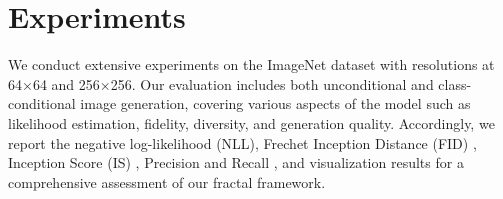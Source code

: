 \section{Experiments}

We conduct extensive experiments on the ImageNet dataset \citep{deng2009imagenet} with resolutions at 64$\times$64 and 256$\times$256. Our evaluation includes both unconditional and class-conditional image generation, covering various aspects of the model such as likelihood estimation, fidelity, diversity, and generation quality. Accordingly, we report the negative log-likelihood (NLL), Frechet Inception Distance (FID) \citep{Heusel2017}, Inception Score (IS) \citep{Salimans2016}, Precision and Recall \citep{Dhariwal2021}, and visualization results for a comprehensive assessment of our fractal framework.

